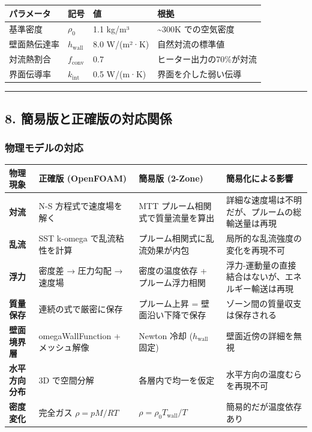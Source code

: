 \documentclass[a4paper,11pt]{article}
\begin{document}
{\small
\noindent
\begin{tabularx}{\textwidth}{|l|L|L|L|}
\hline
\textbf{パラメータ} & \textbf{記号} & \textbf{値} & \textbf{根拠} \\
\hline
基準密度 & $\rho_0$ & 1.1 kg/m³ & \textasciitilde{}300K での空気密度 \\
\hline
壁面熱伝達率 & $h_{\text{wall}}$ & 8.0 W/(m²·K) & 自然対流の標準値 \\
\hline
対流熱割合 & $f_{\text{conv}}$ & 0.7 & ヒーター出力の70\%が対流 \\
\hline
界面伝導率 & $k_{\text{int}}$ & 0.5 W/(m·K) & 界面を介した弱い伝導 \\
\hline
\end{tabularx}
}


\bigskip\hrule\bigskip

\subsection{8. 簡易版と正確版の対応関係}

\subsubsection{物理モデルの対応}

{\small
\noindent
\begin{tabularx}{\textwidth}{|l|L|L|L|}
\hline
\textbf{物理現象} & \textbf{正確版 (OpenFOAM)} & \textbf{簡易版 (2-Zone)} & \textbf{簡易化による影響} \\
\hline
\textbf{対流} & N-S 方程式で速度場を解く & MTT プルーム相関式で質量流量を算出 & 詳細な速度場は不明だが、プルームの総輸送量は再現 \\
\hline
\textbf{乱流} & SST k-omega で乱流粘性を計算 & プルーム相関式に乱流効果が内包 & 局所的な乱流強度の変化を再現不可 \\
\hline
\textbf{浮力} & 密度差 → 圧力勾配 → 速度場 & 密度の温度依存 + プルーム浮力相関 & 浮力-運動量の直接結合はないが、エネルギー輸送は再現 \\
\hline
\textbf{質量保存} & 連続の式で厳密に保存 & プルーム上昇 = 壁面沿い下降で保存 & ゾーン間の質量収支は保存される \\
\hline
\textbf{壁面境界層} & omegaWallFunction + メッシュ解像 & Newton 冷却 ($h_{\text{wall}}$ 固定) & 壁面近傍の詳細を無視 \\
\hline
\textbf{水平方向分布} & 3D で空間分解 & 各層内で均一を仮定 & 水平方向の温度むらを再現不可 \\
\hline
\textbf{密度変化} & 完全ガス $\rho = pM/RT$ & $\rho = \rho_0 T_{\text{wall}} / T$ & 簡易的だが温度依存あり \\
\hline
\end{tabularx}
}
\end{document}
